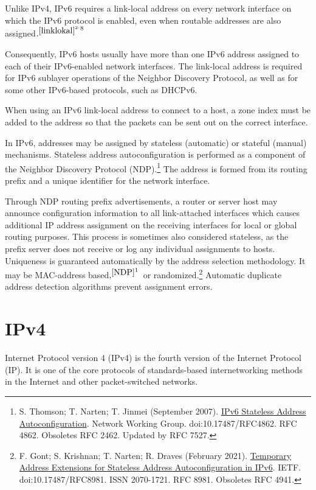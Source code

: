\documentclass[a4paper,12pt]{book}
\begin{document}
Unlike IPv4, IPv6 requires a link-local address on every network interface on which the IPv6 protocol is enabled, even when routable addresses are also assigned$.^{\footnotemark[8 \ref{linklokal}^{2\cdot}]}$ 

Consequently, IPv6 hosts usually have more than one IPv6 address assigned to each of their IPv6-enabled network interfaces. The link-local address is required for IPv6 sublayer operations of the Neighbor Discovery Protocol, as well as for some other IPv6-based protocols, such as DHCPv6.

When using an IPv6 link-local address to connect to a host, a zone index must be added to the address so that the packets can be sent out on the correct interface.

In IPv6, addresses may be assigned by stateless (automatic) or stateful (manual) mechanisms. Stateless address autoconfiguration is performed as a component of the Neighbor Discovery Protocol (NDP).\footnote{\label{NDP} S. Thomson; T. Narten; T. Jinmei (September 2007). \href{https://datatracker.ietf.org/doc/html/rfc4862}{IPv6 Stateless Address Autoconfiguration}. Network Working Group. doi:10.17487/RFC4862. RFC 4862. Obsoletes RFC 2462. Updated by RFC 7527.} The address is formed from its routing prefix and a unique identifier for the network interface.

Through NDP routing prefix advertisements, a router or server host may announce configuration information to all link-attached interfaces which causes additional IP address assignment on the receiving interfaces for local or global routing purposes. This process is sometimes also considered stateless, as the prefix server does not receive or log any individual assignments to hosts. Uniqueness is guaranteed automatically by the address selection methodology. It may be MAC-address based$,^{\footnotemark[1 \ref{NDP}]}$  or randomized.\footnote{\label{randomized} F. Gont; S. Krishnan; T. Narten; R. Draves (February 2021). \href{https://datatracker.ietf.org/doc/html/rfc8981}{Temporary Address Extensions for Stateless Address Autoconfiguration in IPv6}. IETF. doi:10.17487/RFC8981. ISSN 2070-1721. RFC 8981. Obsoletes RFC 4941.} Automatic duplicate address detection algorithms prevent assignment errors.



\section{IPv4}

Internet Protocol version 4 (IPv4) is the fourth version of the Internet Protocol (IP). It is one of the core protocols of standards-based internetworking methods in the Internet and other packet-switched networks.
\end{document}
